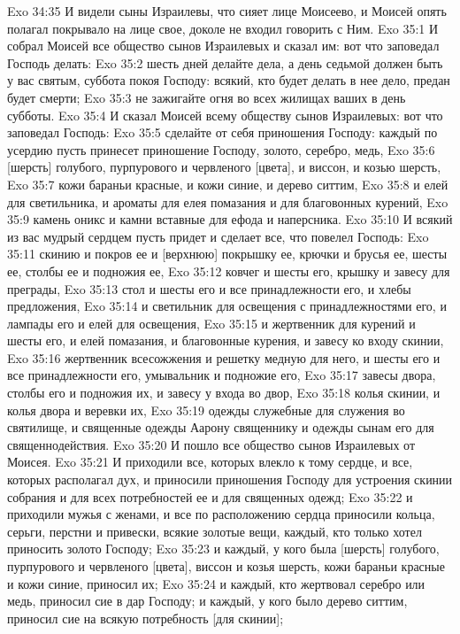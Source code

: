 Exo 34:35  И видели сыны Израилевы, что сияет лице Моисеево, и Моисей опять полагал покрывало на лице свое, доколе не входил говорить с Ним.
Exo 35:1  И собрал Моисей все общество сынов Израилевых и сказал им: вот что заповедал Господь делать:
Exo 35:2  шесть дней делайте дела, а день седьмой должен быть у вас святым, суббота покоя Господу: всякий, кто будет делать в нее дело, предан будет смерти;
Exo 35:3  не зажигайте огня во всех жилищах ваших в день субботы.
Exo 35:4  И сказал Моисей всему обществу сынов Израилевых: вот что заповедал Господь:
Exo 35:5  сделайте от себя приношения Господу: каждый по усердию пусть принесет приношение Господу, золото, серебро, медь,
Exo 35:6  [шерсть] голубого, пурпурового и червленого [цвета], и виссон, и козью шерсть,
Exo 35:7  кожи бараньи красные, и кожи синие, и дерево ситтим,
Exo 35:8  и елей для светильника, и ароматы для елея помазания и для благовонных курений,
Exo 35:9  камень оникс и камни вставные для ефода и наперсника.
Exo 35:10  И всякий из вас мудрый сердцем пусть придет и сделает все, что повелел Господь:
Exo 35:11  скинию и покров ее и [верхнюю] покрышку ее, крючки и брусья ее, шесты ее, столбы ее и подножия ее,
Exo 35:12  ковчег и шесты его, крышку и завесу для преграды,
Exo 35:13  стол и шесты его и все принадлежности его, и хлебы предложения,
Exo 35:14  и светильник для освещения с принадлежностями его, и лампады его и елей для освещения,
Exo 35:15  и жертвенник для курений и шесты его, и елей помазания, и благовонные курения, и завесу ко входу скинии,
Exo 35:16  жертвенник всесожжения и решетку медную для него, и шесты его и все принадлежности его, умывальник и подножие его,
Exo 35:17  завесы двора, столбы его и подножия их, и завесу у входа во двор,
Exo 35:18  колья скинии, и колья двора и веревки их,
Exo 35:19  одежды служебные для служения во святилище, и священные одежды Аарону священнику и одежды сынам его для священнодействия.
Exo 35:20  И пошло все общество сынов Израилевых от Моисея.
Exo 35:21  И приходили все, которых влекло к тому сердце, и все, которых располагал дух, и приносили приношения Господу для устроения скинии собрания и для всех потребностей ее и для священных одежд;
Exo 35:22  и приходили мужья с женами, и все по расположению сердца приносили кольца, серьги, перстни и привески, всякие золотые вещи, каждый, кто только хотел приносить золото Господу;
Exo 35:23  и каждый, у кого была [шерсть] голубого, пурпурового и червленого [цвета], виссон и козья шерсть, кожи бараньи красные и кожи синие, приносил их;
Exo 35:24  и каждый, кто жертвовал серебро или медь, приносил сие в дар Господу; и каждый, у кого было дерево ситтим, приносил сие на всякую потребность [для скинии];
